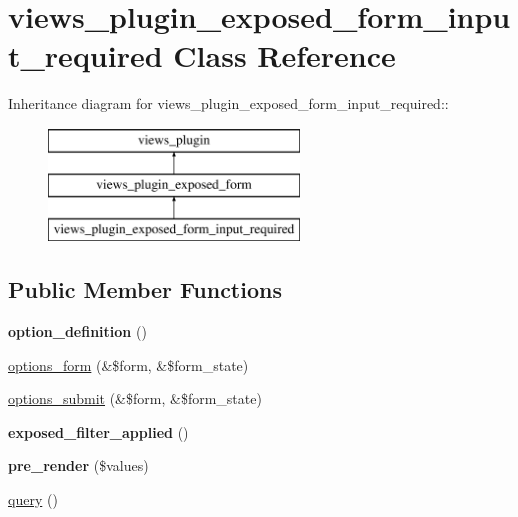 \hypertarget{classviews__plugin__exposed__form__input__required}{
\section{views\_\-plugin\_\-exposed\_\-form\_\-input\_\-required Class Reference}
\label{classviews__plugin__exposed__form__input__required}
}
Inheritance diagram for views\_\-plugin\_\-exposed\_\-form\_\-input\_\-required::\begin{figure}[H]
\begin{center}
\leavevmode
\includegraphics[height=3cm]{classviews__plugin__exposed__form__input__required}
\end{center}
\end{figure}
\subsection*{Public Member Functions}
\begin{DoxyCompactItemize}
\item 
\hypertarget{classviews__plugin__exposed__form__input__required_abc4c4d5f35b843e0f1f1a62e689d116d}{
{\bfseries option\_\-definition} ()}
\label{classviews__plugin__exposed__form__input__required_abc4c4d5f35b843e0f1f1a62e689d116d}

\item 
\hyperlink{classviews__plugin__exposed__form__input__required_a11f06f82df74f11ecb72da72d0d3a1d5}{options\_\-form} (\&\$form, \&\$form\_\-state)
\item 
\hyperlink{classviews__plugin__exposed__form__input__required_a579ab00684c29214329155a4a4de02c2}{options\_\-submit} (\&\$form, \&\$form\_\-state)
\item 
\hypertarget{classviews__plugin__exposed__form__input__required_a7913c9581a4e69270260b45635dcdfb0}{
{\bfseries exposed\_\-filter\_\-applied} ()}
\label{classviews__plugin__exposed__form__input__required_a7913c9581a4e69270260b45635dcdfb0}

\item 
\hypertarget{classviews__plugin__exposed__form__input__required_a283cd5918aebb288de4d8f9892be96b9}{
{\bfseries pre\_\-render} (\$values)}
\label{classviews__plugin__exposed__form__input__required_a283cd5918aebb288de4d8f9892be96b9}

\item 
\hyperlink{classviews__plugin__exposed__form__input__required_a452e5c16da60d3b51cdc56335ca3d3e8}{query} ()
\end{DoxyCompactItemize}


